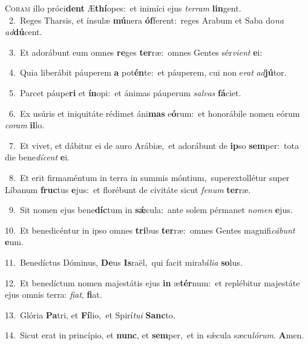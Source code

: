 \lettrine{\initial\textcolor{\initialcolor}{C}}{oram} illo próci\textbf{dent} Æ\-\textbf{thí}\-opes:~\star et inimíci ejus \textit{ter}\-\textit{ram} \textbf{lin}\-gent.\\
{\numbfont\textcolor{\numbcolor}{~2.}}~Reges Tharsis, et ínsulæ \textbf{mú}\-nera \textbf{óf}\-ferent:~\star reges Arabum et Saba do\textit{na} \textit{ad}\-\textbf{dú}cent.\par
{\numbfont\textcolor{\numbcolor}{~3.}}~Et adorábunt eum omnes \textbf{re}\-ges \textbf{ter}\-ræ:~\star omnes Gentes sér\-\textit{vi}\-\textit{ent} \textbf{e}\-i:\par
{\numbfont\textcolor{\numbcolor}{~4.}}~Quia liberábit páuperem \textbf{a} pot\-\textbf{én}\-te:~\star et páuperem, cui non e\textit{rat} \textit{ad}\-\textbf{jú}tor.\par
{\numbfont\textcolor{\numbcolor}{~5.}}~Parcet páupe\textbf{ri} et \textbf{ín}\-opi:~\star et ánimas páuperum \textit{sal}\-\textit{vas} \textbf{fá}\-ciet.\par
{\numbfont\textcolor{\numbcolor}{~6.}}~Ex usúris et iniquitáte rédimet áni\textbf{mas} e\-\textbf{ó}\-rum:~\star et honorábile nomen eórum \textit{co}\-\textit{ram} \textbf{il}\-lo.\par
{\numbfont\textcolor{\numbcolor}{~7.}}~Et vivet, et dábitur ei de auro Arábiæ,~\dagger et adorábunt de \textbf{ip}\-so \textbf{sem}\-per:~\star tota die bene\-\textit{dí}\-\textit{cent} \textbf{e}\-i.\par
{\numbfont\textcolor{\numbcolor}{~8.}}~Et erit firmaméntum in terra in summis móntium,~\dagger superextollétur super Líbanum \textbf{fruc}\-tus \textbf{e}\-jus:~\star et florébunt de civitáte sicut \textit{fe}\-\textit{num} \textbf{ter}\-ræ.\par
{\numbfont\textcolor{\numbcolor}{~9.}}~Sit nomen ejus bene\-\textbf{díc}\-tum in \textbf{sǽ}\-cula:~\star ante solem pérmanet \textit{no}\-\textit{men} \textbf{e}\-jus.\par
{\numbfont\textcolor{\numbcolor}{10.}}~Et benedicéntur in ipso omnes \textbf{tri}\-bus \textbf{ter}\-ræ:~\star omnes Gentes magnifi\-\textit{cá}\-\textit{bunt} \textbf{e}\-um.\par
{\numbfont\textcolor{\numbcolor}{11.}}~Benedíctus Dóminus, \textbf{De}\-us \textbf{Is}\-raël,~\star qui facit mirabí\-\textit{li}\-\textit{a} \textbf{so}\-lus.\par
{\numbfont\textcolor{\numbcolor}{12.}}~Et benedíctum nomen majestátis ejus \textbf{in} æ\-\textbf{tér}\-num:~\star et replébitur majestáte ejus omnis terra: \textit{fi}\-\textit{at}, \textbf{fi}\-at.\par
{\numbfont\textcolor{\numbcolor}{13.}}~Glória \textbf{Pa}\-tri, et \textbf{Fí}\-lio,~\star et Spirí\-\textit{tu}\-\textit{i} \textbf{Sanc}\-to.\par
{\numbfont\textcolor{\numbcolor}{14.}}~Sicut erat in princípio, et \textbf{nunc}\-, et \textbf{sem}\-per,~\star et in sǽcula sæcu\-\textit{ló}\-\textit{rum}. \textbf{A}\-men.\par
